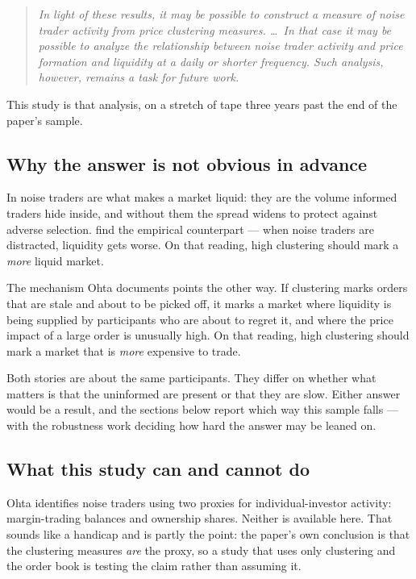 \begin{quote}
\itshape
In light of these results, it may be possible to construct a measure of noise
trader activity from price clustering measures. \dots\ In that case it may be
possible to analyze the relationship between noise trader activity and price
formation and liquidity at a daily or shorter frequency. Such analysis, however,
remains a task for future work.
\end{quote}

This study is that analysis, on a stretch of tape three years past the end of
the paper's sample.

\subsection{Why the answer is not obvious in advance}

In \textcite{Kyle1985} noise traders are what makes a market liquid: they are the
volume informed traders hide inside, and without them the spread widens to
protect against adverse selection. \textcite{PeressSchmidt2020} find the
empirical counterpart --- when noise traders are distracted, liquidity gets
worse. On that reading, high clustering should mark a \emph{more} liquid market.

The mechanism Ohta documents points the other way. If clustering marks orders
that are stale and about to be picked off, it marks a market where liquidity is
being supplied by participants who are about to regret it, and where the price
impact of a large order is unusually high. On that reading, high clustering
should mark a market that is \emph{more} expensive to trade.

Both stories are about the same participants. They differ on whether what matters
is that the uninformed are present or that they are slow. Either answer would be
a result, and the sections below report which way this sample falls --- with the
robustness work deciding how hard the answer may be leaned on.

\subsection{What this study can and cannot do}

Ohta identifies noise traders using two proxies for individual-investor activity:
margin-trading balances and ownership shares. Neither is available here. That
sounds like a handicap and is partly the point: the paper's own conclusion is
that the clustering measures \emph{are} the proxy, so a study that uses only
clustering and the order book is testing the claim rather than assuming it.

